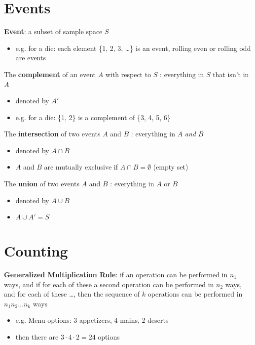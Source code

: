 \documentclass[10pt]{article}
\begin{document}
\section{Events}
\begin{definition}
    \textbf{Event}: a subset of sample space $S$
     \begin{itemize}
        \item e.g. for a die: each element \{1, 2, 3, \ldots \} is an event, rolling even or rolling odd are events 
    \end{itemize}
\end{definition}
\begin{definition}
    The \textbf{complement} of an event $A$ with respect to $S$ : everything in $S$ that isn't in $A$ 
    \begin{itemize}
        \item denoted by $A'$
        \item e.g. for a die: \{1, 2\} is a complement of \{3, 4, 5, 6\}
    \end{itemize}
\end{definition}
\begin{definition}
    The \textbf{intersection} of two events $A$ and $B$ : everything in $A$ \textit{and} $B$
    \begin{itemize}
        \item denoted by $A \cap B$
        \item $A$ and $B$ are mutually exclusive if $A \cap B = \emptyset$ (empty set)
    \end{itemize}
\end{definition}
\begin{definition}
    The \textbf{union} of two events $A$ and $B$ : everything in $A$ or $B$ 
    \begin{itemize}
        \item denoted by $A \cup B$
        \item $A \cup A' = S$
    \end{itemize}
\end{definition}


\section{Counting}
\begin{theorem}
    \textbf{Generalized Multiplication Rule}: if an operation can be performed in $n_1$ ways, and if for each of these a second operation can be performed in $n_2$ ways, and for each of these \ldots, then the sequence of $k$ operations can be performed in $ n_1n_2\ldots n_k$ ways
\end{theorem}
\begin{itemize}
    \item e.g. Menu options: 3 appetizers, 4 mains, 2 deserts
    \item then there are $3 \cdot 4 \cdot 2 = 24$ options
\end{itemize}
\end{document}
